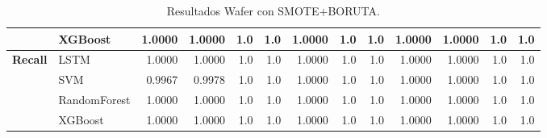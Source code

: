 \begin{table}[h]
\begin{adjustbox}{max width=13cm}
\begin{tabular}{|c|l|r|r|r|r|r|r|r|r|r|r|r|}
			& XGBoost &  1.0000 &  1.0000 &  1.0 &  1.0 &  1.0000 &  1.0 &  1.0 &  1.0000 &  1.0000 &  1.0 &  1.0 \\
			\hline
			\textbf{Recall} & LSTM &  1.0000 &  1.0000 &  1.0 &  1.0 &  1.0000 &  1.0 &  1.0 &  1.0000 &  1.0000 &  1.0 &  1.0 \\
			& SVM &  0.9967 &  0.9978 &  1.0 &  1.0 &  1.0000 &  1.0 &  1.0 &  1.0000 &  1.0000 &  1.0 &  1.0 \\
			& RandomForest &  1.0000 &  1.0000 &  1.0 &  1.0 &  1.0000 &  1.0 &  1.0 &  1.0000 &  1.0000 &  1.0 &  1.0 \\
			& XGBoost &  1.0000 &  1.0000 &  1.0 &  1.0 &  1.0000 &  1.0 &  1.0 &  1.0000 &  1.0000 &  1.0 &  1.0 \\
			\hline
		\end{tabular}
	\end{adjustbox}
	\caption{Resultados Wafer con SMOTE+BORUTA.}
	\label{tab:Wafer_SMOTE_BORUTA}
\end{table}
\newpage

